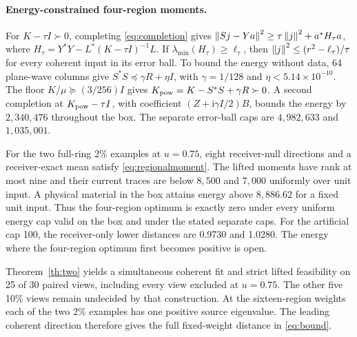 \paragraph{Energy-constrained four-region moments.}
For $K-\tau I\succ0$, completing \eqref{eq:completion} gives $\left\|Sj-Ya\right\|^2\ge\tau\left\|j\right\|^2+a^*H_\tau a$, where $H_\tau=Y^*Y-L^*(K-\tau I)^{-1}L$. If $\lambda_{\min}(H_\tau)\ge\ell_\tau$, then $\left\|j\right\|^2\le (r^2-\ell_\tau)/\tau$ for every coherent input in its error ball. To bound the energy without data, 64 plane-wave columns give $S^*S\preceq\gamma R+\eta I$, with $\gamma=1/128$ and $\eta<5.14\times10^{-10}$. The floor $K/\mu\succeq(3/256)I$ gives $K_{\rm pow}=K-S^*S+\gamma R\succ0$. A second completion at $K_{\rm pow}-\tau I$, with coefficient $(Z+\mathrm i\gamma I/2)B$, bounds the energy by $2{,}340{,}476$ throughout the box. The separate error-ball caps are $4{,}982{,}633$ and $1{,}035{,}001$.

For the two full-ring 2\% examples at $u=0.75$, eight receiver-null directions and a receiver-exact mean satisfy \eqref{eq:regionalmoment}. The lifted moments have rank at most nine and their current traces are below $8{,}500$ and $7{,}000$ uniformly over unit input. A physical material in the box attains energy above $8{,}886.62$ for a fixed unit input. Thus the four-region optimum is exactly zero under every uniform energy cap valid on the box and under the stated separate caps. For the artificial cap 100, the receiver-only lower distances are 0.9730 and 1.0280. The energy where the four-region optimum first becomes positive is open.

Theorem~\ref{th:two} yields a simultaneous coherent fit and strict lifted feasibility on 25 of 30 paired views, including every view excluded at $u=0.75$. The other five 10\% views remain undecided by that construction. At the sixteen-region weights each of the two 2\% examples has one positive source eigenvalue. The leading coherent direction therefore gives the full fixed-weight distance in \eqref{eq:bound}.

